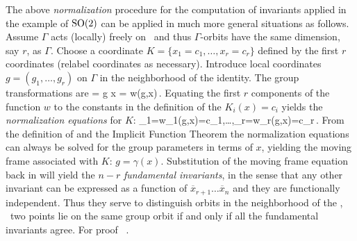 The above \emph{normalization} procedure for the computation of
invariants applied in the example of $\mathrm{SO}(2)$ can be applied
in much more general situations as follows. Assume $\Gamma$
acts (locally) freely on \Manif\  and thus $\Gamma$-orbits
have the same dimension, say $r$, as $\Gamma$.  Choose a
coordinate {\slice} $K=\{x_1=c_1,\ldots,x_r=c_r\}$ defined
by the first $r$ coordinates (relabel coordinates as
necessary). Introduce local coordinates $g=(g_1,\ldots,g_r)$ on
$\Gamma$ in the neighborhood of the identity.
The group transformations are
\beq
	= g \cdot x = w(g,x)\,.
	\label{eq:transNorm}
\eeq
Equating the first $r$ components of the function $w$ to the constants in the definition
of the {\slice} $K_i(x)=c_i$ yields the \emph{normalization equations} for $K$:
\beq
	_1=w_1(g,x)=c_1,\ldots,_r=w_r(g,x)=c_r\,.
	\label{eq:normalization}
\eeq
From the definition of {\slice} and the Implicit Function Theorem the normalization equations
 can always be solved for the group parameters in terms of $x$,
yielding the moving frame associated with $K$: $g=\gamma(x)$. Substitution
of the moving frame equation back in  will yield the $n-r$
\emph{fundamental invariants}, in the sense that any other invariant can be expressed
as a function of $\overline{x}_{r+1}\ldots\overline{x}_n$ and they are functionally independent.
Thus they serve to distinguish orbits in the neighborhood of the {\slice}, \ie~two points lie on the same group
orbit if and only if all the fundamental invariants agree. For proof \cf~.
